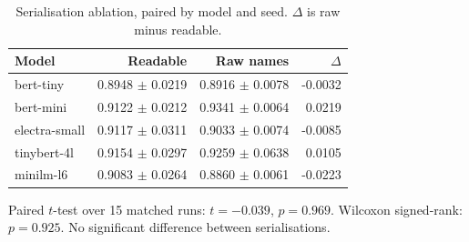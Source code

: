 \begin{table}[htbp]
\centering
\caption{Serialisation ablation, paired by model and seed. $\Delta$ is raw minus readable.}
\label{tab:serialisation}
\small
\begin{tabular}{lrrr}
\toprule
Model & Readable & Raw names & $\Delta$ \\
\midrule
bert-tiny & 0.8948 $\pm$ 0.0219 & 0.8916 $\pm$ 0.0078 & -0.0032 \\
bert-mini & 0.9122 $\pm$ 0.0212 & 0.9341 $\pm$ 0.0064 & 0.0219 \\
electra-small & 0.9117 $\pm$ 0.0311 & 0.9033 $\pm$ 0.0074 & -0.0085 \\
tinybert-4l & 0.9154 $\pm$ 0.0297 & 0.9259 $\pm$ 0.0638 & 0.0105 \\
minilm-l6 & 0.9083 $\pm$ 0.0264 & 0.8860 $\pm$ 0.0061 & -0.0223 \\
\bottomrule
\end{tabular}
\vspace{2pt}
\footnotesize Paired $t$-test over 15 matched runs: $t = -0.039$, $p = 0.969$. Wilcoxon signed-rank: $p = 0.925$. No significant difference between serialisations.
\end{table}
